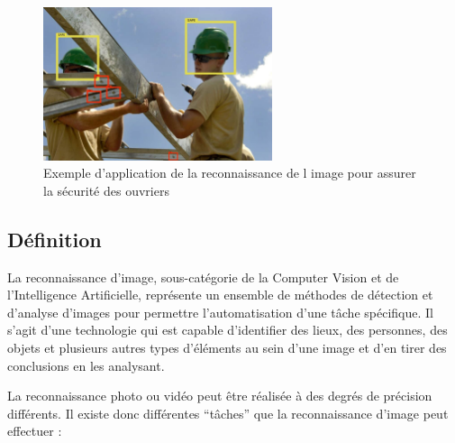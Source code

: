 \documentclass[a4paper,12pt]{report}
\begin{document}
\begin{figure}[ht]
    \centering
    \includegraphics[width=0.6\textwidth]{image recognition.jpg}
    \caption{Exemple d'application de la reconnaissance de l image pour assurer la sécurité des ouvriers}
    \label{fig:my_label}
\end{figure}


\subsection{Définition}
La reconnaissance d’image, sous-catégorie de la Computer Vision et de l’Intelligence Artificielle, représente un ensemble de méthodes de détection et d’analyse d’images pour permettre l’automatisation d’une tâche spécifique. Il s’agit d’une technologie qui est capable d’identifier des lieux, des personnes, des objets et plusieurs autres types d’éléments au sein d’une image et d’en tirer des conclusions en les analysant.

La reconnaissance photo ou vidéo peut être réalisée à des degrés de précision différents.
Il existe donc différentes “tâches” que la reconnaissance d’image peut \\effectuer :\\
\end{document}
